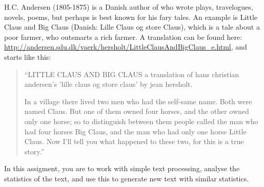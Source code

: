 H.C. Andersen (1805-1875) is a Danish author of who wrote plays, travelogues, novels, poems, but perhaps is best known for his fary tales. An example is Little Claus and Big Claus (Danish: Lille Claus og store Claus), which is a tale about a poor farmer, who outsmarts a rich farmer. A translation can be found here: \url{http://andersen.sdu.dk/vaerk/hersholt/LittleClausAndBigClaus_e.html}, and starts like this:
\begin{quote}
  ``LITTLE CLAUS AND BIG CLAUS
a translation of hans christian andersen's 'lille claus og store claus' by jean hersholt.

In a village there lived two men who had the self-same name. Both were named Claus. But one of them owned four horses, and the other owned only one horse; so to distinguish between them people called the man who had four horses Big Claus, and the man who had only one horse Little Claus. Now I'll tell you what happened to these two, for this is a true story.''
\end{quote}

In this assigment, you are to work with simple text processing, analyse the statistics of the text, and use this to generate new text with similar statistics.